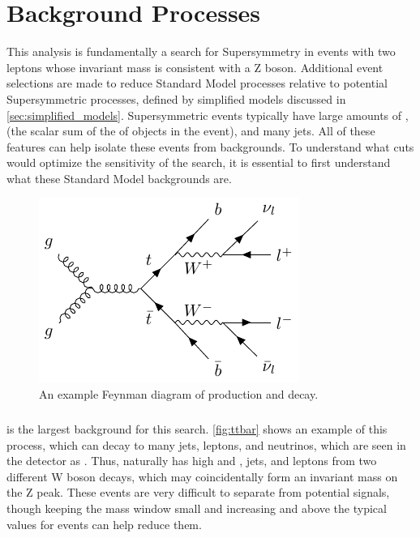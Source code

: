 
\chapter{Background Processes} %

\label{ch:background_processes} 


This analysis is fundamentally a search for Supersymmetry in events with two leptons whose invariant mass is consistent with a Z boson. Additional event selections are made to reduce Standard Model processes relative to potential Supersymmetric processes, defined by simplified models discussed in \autoref{sec:simplified_models}. Supersymmetric events typically have large amounts of \MET, \HT (the scalar sum of the \pT of objects in the event), and many jets. All of these features can help isolate these events from backgrounds. To understand what cuts would optimize the sensitivity of the search, it is essential to first understand what these Standard Model backgrounds are. 

\begin{centering}
\begin{figure}[bth]
\myfloatalign
\includegraphics[width=.70\linewidth]{feynman/ttbar.pdf}
\caption{An example Feynman diagram of \ttbar production and decay.}
\label{fig:ttbar}
\end{figure}
\end{centering}

\paragraph{\ttbar} is the largest background for this search. \autoref{fig:ttbar} shows an example of this process, which can decay to many jets, leptons, and neutrinos, which are seen in the detector as \MET. Thus, \ttbar naturally has high \MET and \HT, jets, and leptons from two different W boson decays, which may coincidentally form an invariant mass on the Z peak. These events are very difficult to separate from potential signals, though keeping the mass window small and increasing \MET and \HT above the typical values for \ttbar events can help reduce them.

